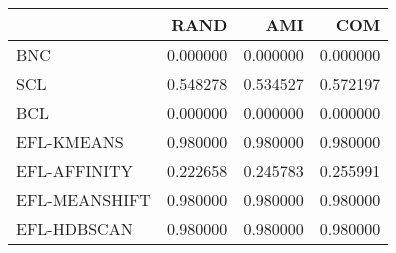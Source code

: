 \begin{tabular}{lrrr}
\toprule
 & RAND & AMI & COM \\
\midrule
BNC & 0.000000 & 0.000000 & 0.000000 \\
SCL & 0.548278 & 0.534527 & 0.572197 \\
BCL & 0.000000 & 0.000000 & 0.000000 \\
EFL-KMEANS & 0.980000 & 0.980000 & 0.980000 \\
EFL-AFFINITY & 0.222658 & 0.245783 & 0.255991 \\
EFL-MEANSHIFT & 0.980000 & 0.980000 & 0.980000 \\
EFL-HDBSCAN & 0.980000 & 0.980000 & 0.980000 \\
\bottomrule
\end{tabular}
